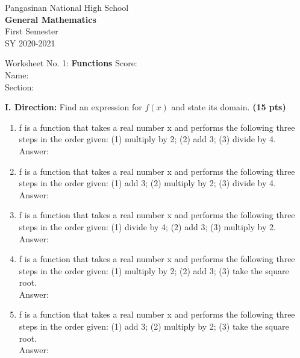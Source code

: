 \documentclass[11pt]{article}
\begin{document}
\begin{center}
Pangasinan National High School \\
\textbf{General Mathematics } \\
First Semester \\
SY 2020-2021
\end{center}


\begin{flushleft}
Worksheet No. 1: \textbf{Functions}\hspace{3in} Score:\enspace\hrulefill \\
Name:\enspace\hrulefill \\
Section:\enspace\hrulefill
\end{flushleft}



\noindent \textbf{I. Direction:} Find an expression for $f(x)$ and state its domain. \textbf{(15 pts)}

\begin{enumerate}
\item f is a function that takes a real number x and performs the following three steps in the order given: (1) multiply by 2; (2) add 3; (3) divide by 4.\\Answer:
\item f is a function that takes a real number x and performs the following three steps in the order given: (1) add 3; (2) multiply by 2; (3) divide by 4.\\Answer:
\item f is a function that takes a real number x and performs the following three steps in the order given: (1) divide by 4; (2) add 3; (3) multiply by 2.\\Answer:
\item f is a function that takes a real number x and performs the following three steps in the order given: (1) multiply by 2; (2) add 3; (3) take the square root.\\Answer:
\item f is a function that takes a real number x and performs the following three steps in the order given: (1) add 3; (2) multiply by 2; (3) take the square root.\\Answer:


\end{enumerate}
\end{document}
